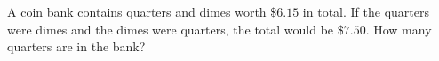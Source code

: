A coin bank contains quarters and dimes worth $\$6.15$ in total. If the quarters were dimes and the dimes were quarters, the total would be $\$7.50$. How many quarters are in the bank?
